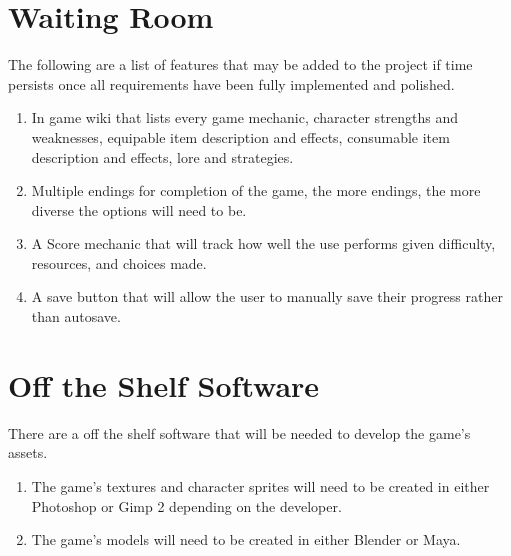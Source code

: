 \documentclass{article}
\begin{document}
\section{Waiting Room}
\quad The following are a list of features that may be added to the project if time persists once all requirements have been fully implemented and polished.
	\begin{enumerate}
	\item In game wiki that lists every game mechanic, character strengths and weaknesses, equipable item description and effects, consumable item description and effects, lore and strategies.
	\item Multiple endings for completion of the game, the more endings, the more diverse the options will need to be.
	\item A Score mechanic that will track how well the use performs given difficulty, resources, and choices made.
	\item A save button that will allow the user to manually save their progress rather than autosave.
	\end{enumerate}
\section{Off the Shelf Software}
\quad There are a off the shelf software that will be needed to develop the game's assets.
\begin{enumerate}[{OSS}1. ]
	\item The game's textures and character sprites will need to be created in either Photoshop or Gimp 2 depending on the developer.
	\item The game's models will need to be created in either Blender or Maya.
\end{enumerate}
\end{document}
